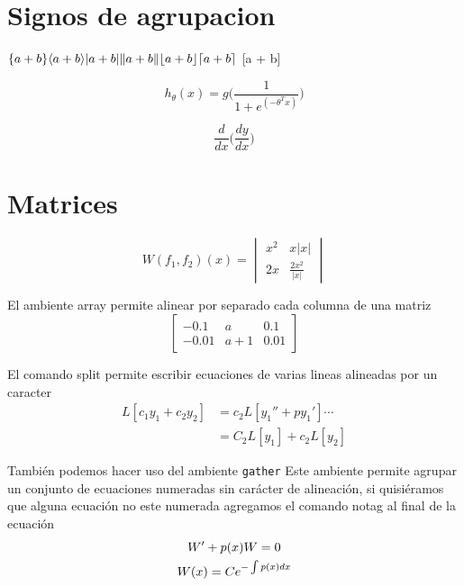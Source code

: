 \documentclass{report}
\begin{document}
\section{Signos de agrupacion}
$
\{a+b\}\\
\langle a+b	\rangle\\
\lvert a+b	\rvert \\
\lVert a+b	\rVert \\
\lfloor	a+b \rfloor\\
\lceil	a+b \rceil\\$
[a + b]

\[
h_\theta(x)=g\Bigg(\frac{1}{1+e^{(-\theta^Tx)}}\Bigg)
\]



\[
\frac{d}{dx}\Biggl(\frac{dy}{dx}\Biggr)
\]


\section{Matrices}

\[
W(f_1, f_2)(x)=
\begin{vmatrix}
x^2 & x|x|\\2x & \frac{2x^2}{|x|}
\end{vmatrix}
\]

El ambiente array permite alinear por separado cada columna de una matriz
\[\left[
\begin{array}{lcr}	%
-0.1 & a & 0.1 \\ -0.01 & a+1 & 0.01
\end{array} \right]
\]

El comando split permite escribir ecuaciones de varias lineas alineadas por un caracter
\[
\begin{split}
L[c_1y_1 + c_2y_2] &= c_2L[y_1'' + py_1']\cdots \\
&= C_2L[y_1] + c_2L[y_2]
\end{split}	%
\]

También podemos hacer uso del ambiente \texttt{gather} Este ambiente permite agrupar un conjunto de ecuaciones numeradas sin carácter de alineación, si quisiéramos que alguna ecuación no este numerada agregamos el comando notag al final de la ecuación
\begin{gather}
W' + p(x)W=0 \\
W(x) = Ce^{-\int p(x) dx}	\notag 	%
\end{gather}
\end{document}
